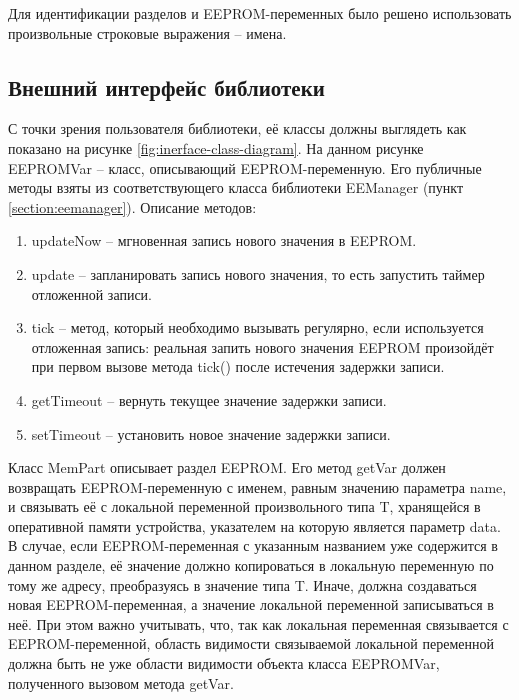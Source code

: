 Для идентификации разделов и EEPROM-переменных было решено использовать произвольные строковые выражения -- имена.



\subsection{Внешний интерфейс библиотеки}

С точки зрения пользователя библиотеки, её классы должны выглядеть как показано на рисунке \ref{fig:inerface-class-diagram}.
На данном рисунке EEPROMVar -- класс, описывающий EEPROM-переменную.
Его публичные методы взяты из соответствующего класса библиотеки EEManager (пункт \ref{section:eemanager}).
Описание методов:
\begin{enumerate}
	\item updateNow -- мгновенная запись нового значения в EEPROM.
	\item update -- запланировать запись нового значения, то есть запустить таймер отложенной записи.
	\item tick -- метод, который необходимо вызывать регулярно, если используется отложенная запись: реальная запить нового значения EEPROM произойдёт при первом вызове метода tick() после истечения задержки записи.
	\item getTimeout -- вернуть текущее значение задержки записи.
	\item setTimeout -- установить новое значение задержки записи.
\end{enumerate}

Класс MemPart описывает раздел EEPROM. 
Его метод getVar должен возвращать EEPROM-переменную с именем, равным значению параметра name, и связывать её с локальной переменной произвольного типа T, хранящейся в оперативной памяти устройства, указателем на которую является параметр data.
В случае, если EEPROM-переменная с указанным названием уже содержится в данном разделе, её значение должно копироваться в локальную переменную по тому же адресу, преобразуясь в значение типа T.
Иначе, должна создаваться новая EEPROM-переменная, а значение локальной переменной записываться в неё.
При этом важно учитывать, что, так как локальная переменная связывается с EEPROM-переменной, область видимости связываемой локальной переменной должна быть не уже области видимости объекта класса EEPROMVar, полученного вызовом метода getVar.

